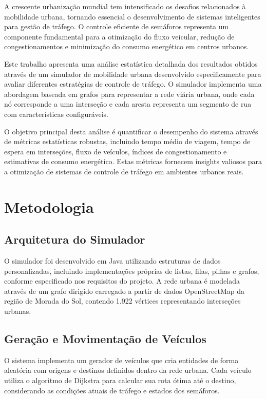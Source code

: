 \documentclass[12pt,a4paper]{article}
\begin{document}
A crescente urbanização mundial tem intensificado os desafios relacionados à mobilidade urbana, tornando essencial o desenvolvimento de sistemas inteligentes para gestão de tráfego. O controle eficiente de semáforos representa um componente fundamental para a otimização do fluxo veicular, redução de congestionamentos e minimização do consumo energético em centros urbanos.

Este trabalho apresenta uma análise estatística detalhada dos resultados obtidos através de um simulador de mobilidade urbana desenvolvido especificamente para avaliar diferentes estratégias de controle de tráfego. O simulador implementa uma abordagem baseada em grafos para representar a rede viária urbana, onde cada nó corresponde a uma interseção e cada aresta representa um segmento de rua com características configuráveis.

O objetivo principal desta análise é quantificar o desempenho do sistema através de métricas estatísticas robustas, incluindo tempo médio de viagem, tempo de espera em interseções, fluxo de veículos, índices de congestionamento e estimativas de consumo energético. Estas métricas fornecem insights valiosos para a otimização de sistemas de controle de tráfego em ambientes urbanos reais.

\section{Metodologia}

\subsection{Arquitetura do Simulador}

O simulador foi desenvolvido em Java utilizando estruturas de dados personalizadas, incluindo implementações próprias de listas, filas, pilhas e grafos, conforme especificado nos requisitos do projeto. A rede urbana é modelada através de um grafo dirigido carregado a partir de dados OpenStreetMap da região de Morada do Sol, contendo 1.922 vértices representando interseções urbanas.

\subsection{Geração e Movimentação de Veículos}

O sistema implementa um gerador de veículos que cria entidades de forma aleatória com origens e destinos definidos dentro da rede urbana. Cada veículo utiliza o algoritmo de Dijkstra para calcular sua rota ótima até o destino, considerando as condições atuais de tráfego e estados dos semáforos.
\end{document}
